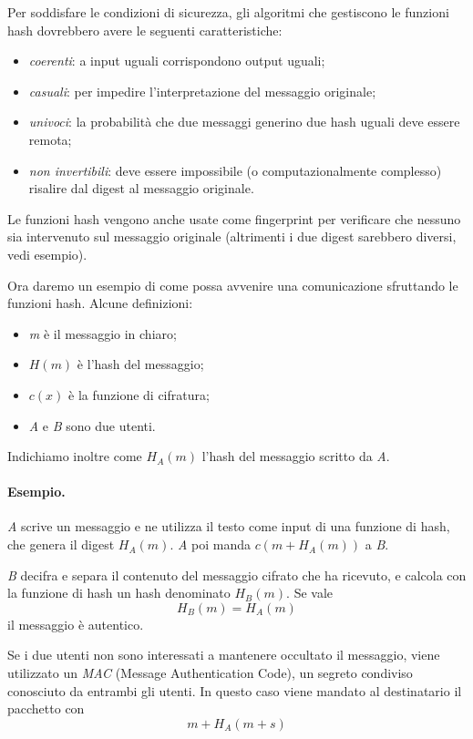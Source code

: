 \documentclass[a4paper, 11pt]{article}
\begin{document}
\begin{multicols}{2}
		Per soddisfare le condizioni di sicurezza, gli algoritmi che gestiscono le funzioni hash dovrebbero avere le seguenti caratteristiche:
		\begin{itemize}
			\item \textit{coerenti}: a input uguali corrispondono output uguali;
			\item \textit{casuali}: per impedire l'interpretazione del messaggio originale;
			\item \textit{univoci}: la probabilità che due messaggi generino due hash uguali deve essere remota;
			\item \textit{non invertibili}: deve essere impossibile (o computazionalmente complesso) risalire dal digest al messaggio originale.
		\end{itemize}
	
		Le funzioni hash vengono anche usate come fingerprint per verificare che nessuno sia intervenuto sul messaggio originale (altrimenti i due digest sarebbero diversi, vedi esempio).
		
		Ora daremo un esempio di come possa avvenire una comunicazione sfruttando le funzioni hash.
		Alcune definizioni:
		\begin{itemize}
			\item \textit{m} è il messaggio in chiaro;
			\item $H(m)$ è l'hash del messaggio;
			\item $c(x)$ è la funzione di cifratura;
			\item \textit{A} e \textit{B} sono due utenti.
		\end{itemize}
		Indichiamo inoltre come $H_A(m)$ l'hash del messaggio scritto da \textit{A}.
		
		\paragraph{Esempio.} \textit{A} scrive un messaggio e ne utilizza il testo come input di una funzione di hash, che genera il digest $H_A(m)$. \textit{A} poi manda $c(m + H_A(m))$ a \textit{B}. 
		
		\textit{B} decifra e separa il contenuto del messaggio cifrato che ha ricevuto, e calcola con la funzione di hash un hash denominato $H_B(m)$. Se vale \[ H_B(m) = H_A(m) \] il messaggio è autentico.
		
		Se i due utenti non sono interessati a mantenere occultato il messaggio, viene utilizzato un \textit{MAC} (Message Authentication Code), un segreto condiviso conosciuto da entrambi gli utenti. In questo caso viene mandato al destinatario il pacchetto con \[ m + H_A(m + s) \] 
		

\end{multicols}
\end{document}
